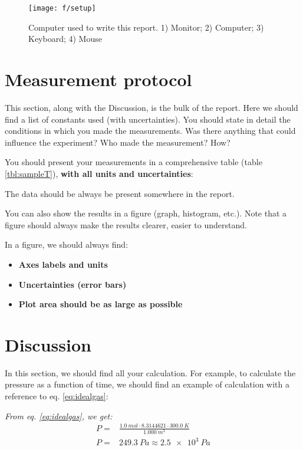 \documentclass[11pt, a4paper]{article}
\begin{document}
\begin{figure}[!h]
\centering
        \texttt{[image: f/setup]}
         \caption{Computer used to write this report. 1) Monitor; 2) Computer; 3) Keyboard; 4) Mouse} 
\label{fig:setup}
\end{figure}


\section*{Measurement protocol} %

This section, along with the Discussion, is the bulk of the report. Here we should find a list of constants used (with uncertainties). You should state in detail the conditions in which you made the measurements. Was there anything that could influence the experiment? Who made the measurement? How?

You should present your measurements in a comprehensive table (table \ref{tbl:sampleT}), \textbf{with all units and uncertainties}:


The data should be always be present somewhere in the report.

You can also show the results in a figure (graph, histogram, etc.). Note that a figure should always make the results clearer, easier to understand.

In a figure, we should always find: 
\begin{itemize}
\item \textbf{Axes labels and units}
\item \textbf{Uncertainties (error bars)}
\item \textbf{Plot area should be as large as possible}
\end{itemize}


\section*{Discussion} %

In this section, we should find all your calculation. For example, to calculate the pressure as a function of time, we should find an example of calculation with a reference to eq. \ref{eq:idealgas}:

\emph{From eq. \ref{eq:idealgas}, we get:}
\begin{equation*}
\begin{aligned}
P =& \frac{\SI{1.0}{mol} \cdot 8.3144621 \cdot \SI{300.0}{K}}{\SI{1.000}{m^3}} \\
P =& \SI{249.3}{Pa} \approx \SI{2.5e3}{Pa} 
\end{aligned}
\end{equation*}
\end{document}

